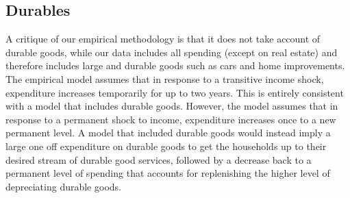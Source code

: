 \documentclass[titlepage]{\econtex}\newcommand{\texname}{ConsumptionHeterogeneity}
\begin{document}
\subsection{Durables} \label{durables}
A critique of our empirical methodology is that it does not take account of durable goods, while our data includes all spending (except on real estate) and therefore includes large and durable goods such as cars and home improvements. The empirical model assumes that in response to a transitive income shock, expenditure increases temporarily for up to two years. This is entirely consistent with a model that includes durable goods. However, the model assumes that in response to a permanent shock to income, expenditure increases once to a new permanent level. A model that included durable goods would instead imply a large one off expenditure on durable goods to get the households up to their desired stream of durable good services, followed by a decrease back to a permanent level of spending that accounts for replenishing the higher level of depreciating durable goods.
\end{document}
